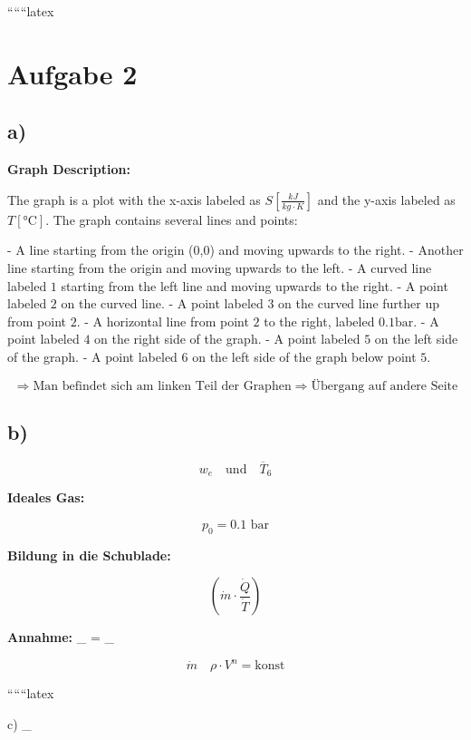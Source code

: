 
``````latex


\section*{Aufgabe 2}

\subsection*{a)}

\begin{center}
\textbf{Graph Description:}
\end{center}

The graph is a plot with the x-axis labeled as $S \left[ \frac{kJ}{kg \cdot K} \right]$ and the y-axis labeled as $T \left[ \text{°C} \right]$. The graph contains several lines and points:

- A line starting from the origin (0,0) and moving upwards to the right.
- Another line starting from the origin and moving upwards to the left.
- A curved line labeled $1$ starting from the left line and moving upwards to the right.
- A point labeled $2$ on the curved line.
- A point labeled $3$ on the curved line further up from point $2$.
- A horizontal line from point $2$ to the right, labeled $0.1 \text{bar}$.
- A point labeled $4$ on the right side of the graph.
- A point labeled $5$ on the left side of the graph.
- A point labeled $6$ on the left side of the graph below point $5$.

\[
\Rightarrow \text{Man befindet sich am linken Teil der Graphen} \Rightarrow \text{Übergang auf andere Seite}
\]

\subsection*{b)}

\[
w_e \quad \text{und} \quad \overline{T}_6
\]

\textbf{Ideales Gas:}

\[
p_0 = 0.1 \text{ bar}
\]

\textbf{Bildung in die Schublade:}

\[
\left( \dot{m} \cdot \frac{\dot{Q}}{\dot{T}} \right)
\]

\textbf{Annahme:} \quad {}_{} = _{}

\[
\dot{m} \quad \rho \cdot V^n = \text{konst}
\]

``````latex

c) \quad {}_{}

